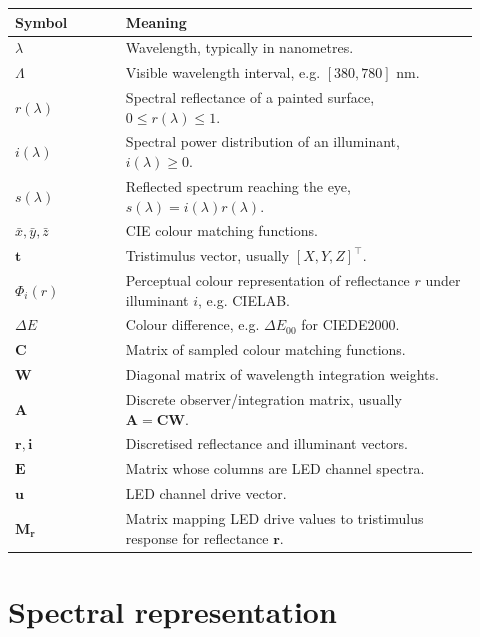 \documentclass[11pt,a4paper]{article}
\newcommand{\vect}[1]{\boldsymbol{#1}}
\newcommand{\mat}[1]{\mathbf{#1}}
\newcommand{\DE}{\Delta E}
\begin{document}
\begin{longtable}{@{}p{0.22\linewidth}p{0.70\linewidth}@{}}
\toprule
Symbol & Meaning \\
\midrule
$\lambda$ & Wavelength, typically in nanometres. \\
$\Lambda$ & Visible wavelength interval, e.g. $[380,780]$ nm. \\
$r(\lambda)$ & Spectral reflectance of a painted surface, $0 \le r(\lambda) \le 1$. \\
$i(\lambda)$ & Spectral power distribution of an illuminant, $i(\lambda) \ge 0$. \\
$s(\lambda)$ & Reflected spectrum reaching the eye, $s(\lambda)=i(\lambda)r(\lambda)$. \\
$\bar{x},\bar{y},\bar{z}$ & CIE colour matching functions. \\
$\vect{t}$ & Tristimulus vector, usually $[X,Y,Z]^\top$. \\
$\Phi_i(r)$ & Perceptual colour representation of reflectance $r$ under illuminant $i$, e.g. CIELAB. \\
$\DE$ & Colour difference, e.g. $\DE_{00}$ for CIEDE2000. \\
$\mat{C}$ & Matrix of sampled colour matching functions. \\
$\mat{W}$ & Diagonal matrix of wavelength integration weights. \\
$\mat{A}$ & Discrete observer/integration matrix, usually $\mat{A}=\mat{C}\mat{W}$. \\
$\vect{r},\vect{i}$ & Discretised reflectance and illuminant vectors. \\
$\mat{E}$ & Matrix whose columns are LED channel spectra. \\
$\vect{u}$ & LED channel drive vector. \\
$\mat{M}_{\vect{r}}$ & Matrix mapping LED drive values to tristimulus response for reflectance $\vect{r}$. \\
\bottomrule
\end{longtable}

\section{Spectral representation}
\end{document}
